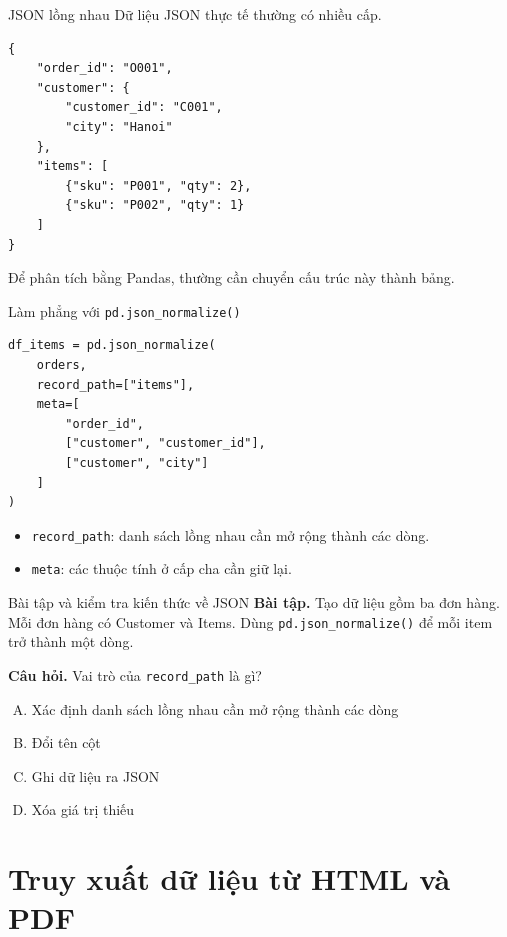 \documentclass[aspectratio=169,11pt]{beamer}
\newcommand{\code}[1]{\texttt{#1}}
\newcommand{\smallgap}{\vspace{0.4em}}
\begin{document}
\begin{frame}[fragile]{JSON lồng nhau}
Dữ liệu JSON thực tế thường có nhiều cấp.

\begin{lstlisting}[style=pythonstyle]
{
    "order_id": "O001",
    "customer": {
        "customer_id": "C001",
        "city": "Hanoi"
    },
    "items": [
        {"sku": "P001", "qty": 2},
        {"sku": "P002", "qty": 1}
    ]
}
\end{lstlisting}

Để phân tích bằng Pandas, thường cần chuyển cấu trúc này thành bảng.
\end{frame}

\begin{frame}[fragile]{Làm phẳng với \code{pd.json\_normalize()}}
\begin{lstlisting}[style=pythonstyle]
df_items = pd.json_normalize(
    orders,
    record_path=["items"],
    meta=[
        "order_id",
        ["customer", "customer_id"],
        ["customer", "city"]
    ]
)
\end{lstlisting}

\begin{itemize}
  \item \code{record\_path}: danh sách lồng nhau cần mở rộng thành các dòng.
  \item \code{meta}: các thuộc tính ở cấp cha cần giữ lại.
\end{itemize}
\end{frame}

\begin{frame}{Bài tập và kiểm tra kiến thức về JSON}
\textbf{Bài tập.} Tạo dữ liệu gồm ba đơn hàng. Mỗi đơn hàng có Customer và Items. Dùng \code{pd.json\_normalize()} để mỗi item trở thành một dòng.

\smallgap
\textbf{Câu hỏi.} Vai trò của \code{record\_path} là gì?
\begin{enumerate}[A.]
  \item Xác định danh sách lồng nhau cần mở rộng thành các dòng
  \item Đổi tên cột
  \item Ghi dữ liệu ra JSON
  \item Xóa giá trị thiếu
\end{enumerate}
\end{frame}

\section{Truy xuất dữ liệu từ HTML và PDF}
\end{document}
